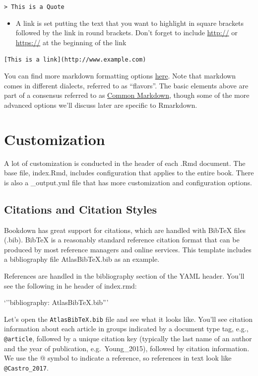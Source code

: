 \documentclass[]{tufte-book}
\providecommand{\tightlist}{%
  \setlength{\itemsep}{0pt}\setlength{\parskip}{0pt}}
\begin{document}
\texttt{\textgreater{}\ This\ is\ a\ Quote}

\begin{itemize}
\tightlist
\item
  A link is set putting the text that you want to highlight in square
  brackets followed by the link in round brackets. Don't forget to
  include \url{http://} or \url{https://} at the beginning of the link
\end{itemize}

\texttt{{[}This\ is\ a\ link{]}(http://www.example.com)}

You can find more markdown formatting options
\href{https://bookdown.org/yihui/rmarkdown/markdown-syntax.html}{here}.
Note that markdown comes in different dialects, referred to as
``flavors''. The basic elements above are part of a consensus referred
to as \href{http://commonmark.org/}{Common Markdown}, though some of the
more advanced options we'll discuss later are specific to Rmarkdown.

\chapter{Customization}\label{customization}

A lot of customization is conducted in the header of each .Rmd document.
The base file, index.Rmd, includes configuration that applies to the
entire book. There is also a \_output.yml file that has more
customization and configuration options.

\section{Citations and Citation
Styles}\label{citations-and-citation-styles}

Bookdown has great support for citations, which are handled with BibTeX
files (.bib). BibTeX is a reasonably standard reference citation format
that can be produced by most reference managers and online services.
This template includes a bibliography file AtlasBibTeX.bib as an
example.

References are handled in the bibliography section of the YAML header.
You'll see the following in he header of index.rmd:

`''bibliography: AtlasBibTeX.bib'''

Let's open the \texttt{AtlasBibTeX.bib} file and see what it looks like.
You'll see citation information about each article in groups indicated
by a document type tag, e.g., \texttt{@article}, followed by a unique
citation key (typically the last name of an author and the year of
publication, e.g.~Young\_2015), followed by citation information. We use
the @ symbol to indicate a reference, so references in text look like
\texttt{@Castro\_2017}.
\end{document}
